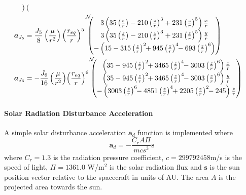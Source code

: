\begin{align}
{\begin{pmatrix}
	\end{pmatrix}}
	\label{eq:gm:aJ4}
	\\
	\bm a_{J_{5}} &=  \frac{J_{5}}{8}
	\left(\frac{\mu}{r^{2}}\right)
	\left( \frac{r_{eq}}{r}\right)^{5}
	\leftexp{N\!\!\!}{
	\begin{pmatrix}
		3\left(35\left(\frac{z}{r}\right) - 210
		\left(\frac{z}{r}\right)^{3} +231 \left(\frac{z}{r}\right)^{5}
		\right) \frac{x}{r} \\
		3\left(35\left(\frac{z}{r}\right) - 210
		\left(\frac{z}{r}\right)^{3} +231 \left(\frac{z}{r}\right)^{5}
		\right) \frac{y}{r} \\
		-\left(15- 315\left(\frac{z}{r}\right)^{2} \!\!+ 945
		\left( \frac{z}{r}\right)^{4}\!\! -693 \left(\frac{z}{r}\right)^{6}
		\right)
	\end{pmatrix}}
	\label{eq:gm:aJ5}
	\\
	\bm a_{J_{6}} &=  -\frac{J_{6}}{16}
	\left(\frac{\mu}{r^{2}}\right)\!
	\left( \frac{r_{eq}}{r}\right)^{6}\!
	\leftexp{N\!\!\!}{
	\begin{pmatrix}
		\left(35 - 945 \left(\frac{z}{r}\right)^{2} \!\!
		+ 3465 \left(\frac{z}{r}\right)^{4} \!\!
		- 3003 \left(\frac{z}{r}\right)^{6}
		\right) \frac{x}{r} \\
		\left(35 - 945 \left(\frac{z}{r}\right)^{2} \!\!
		+ 3465 \left(\frac{z}{r}\right)^{4} \!\!
		- 3003 \left(\frac{z}{r}\right)^{6}
		\right) \frac{y}{r} \\
		-\left( 3003 \left(\frac{z}{r}\right)^{6} \!\!
		-4851 \left(\frac{z}{r}\right)^{4}\!\!
		+ 2205 \left(\frac{z}{r}\right)^{2}\!\!
		- 245
		\right) \frac{z}{r}
	\end{pmatrix}}
	\label{eq:gm:aJ6}
\end{align}

\paragraph{Solar Radiation Disturbance Acceleration}
A simple solar disturbance acceleration $\bm a_{d}$ function is implemented where
\begin{equation}
	\bm a_{d} = - \frac{C_{r} A \Pi}{m c s^{3}} \bm s
\end{equation}
where $C_{r} = 1.3$ is the radiation pressure coefficient,  $c = 299792458$m/s is the speed of light, $\Pi = 1361.0$ W/m$^{2}$ is the solar radiation flux and $\bm s$ is the sun position vector relative to the spacecraft in units of AU.  The area $A$ is the projected area towards the sun.



